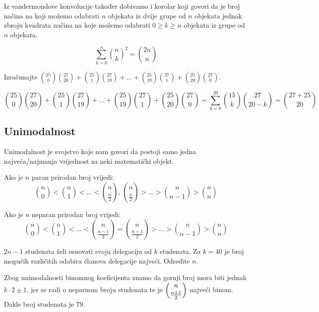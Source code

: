 Iz vandermondove konvolucije također dobivamo i korolar koji govori da je broj
načina na koji možemo odabrati $n$ objekata iz dvije grupe od $n$ objekata
jednak zbroju kvadrata načina na koje možemo odabrati $0 \geq k \geq n$ objekata
iz grupe od $n$ objekata.

\begin{corollary}
    $$
        \sum_{k=0}^{n} \binom{n}{k}^2 = \binom{2n}{n}
    $$
\end{corollary}

\begin{problem}
    Izračunajte $\displaystyle \binom{25}{0}\binom{27}{20}+\binom{25}{1}\binom{27}{19}+\dots+\binom{25}{19}\binom{27}{1}+\binom{25}{20}\binom{27}{0}$.
\end{problem}

$$
\binom{25}{0}\binom{27}{20}+\binom{25}{1}\binom{27}{19}+\dots+\binom{25}{19}\binom{27}{1}+\binom{25}{20}\binom{27}{0} = \sum_{k=0}^{20} \binom{15}{k}\binom{27}{20-k} = \binom{27+25}{20}
$$


\subsection{Unimodalnost}

Unimodalnost je svojstvo koje nam govori da postoji samo jedna najveća/najmanja
vrijednost za neki matematički objekt.

Ako je $n$ paran prirodan broj vrijedi:
$$
\binom{n}{0}<\binom{n}{1}<\dots<\binom{n}{\frac{n}{2}},\, \binom{n}{\frac{n}{2}}>\dots>\binom{n}{n-1}>\binom{n}{n}
$$

\noindent
Ako je $n$ neparan prirodan broj vrijedi:
$$
\binom{n}{0}<\binom{n}{1}<\dots<\binom{n}{\frac{n-1}{2}} = \binom{n}{\frac{n+1}{2}}>\dots>\binom{n}{n-1}>\binom{n}{n}
$$

\begin{problem}
    $2n - 1$ studenata želi osnovati svoju delegaciju od $k$ studenata. Za $k = 40$ je
    broj mogućih različitih odabira članova delegacije najveći. Odredite $n$.
\end{problem}

Zbog unimodalnosti binomnog koeficijenta znamo da gornji broj mora biti jednak
$k\cdot 2 \pm 1$, jer se radi o neparnom broju studenata te je
$\dbinom{n}{\frac{n\pm 1}{2}}$ najveći binom. Dakle broj studenata je $79$.
